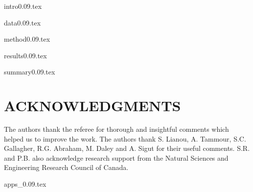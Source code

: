 \documentclass[useAMS,usenatbib]{mn2e}
\begin{document}
{intro0.09.tex}

{data0.09.tex}

{method0.09.tex}

{results0.09.tex}

{summary0.09.tex}

\section*{ACKNOWLEDGMENTS}
The authors thank the referee for thorough and insightful comments which helped us to improve the work.
The authors thank S. Lianou, A. Tammour, S.C. Gallagher, R.G. Abraham, M. Daley and A. Sigut for their useful comments. 
S.R. and P.B. also acknowledge research support from the Natural Sciences and Engineering Research Council of Canada. 




{apps_0.09.tex}
\end{document}
